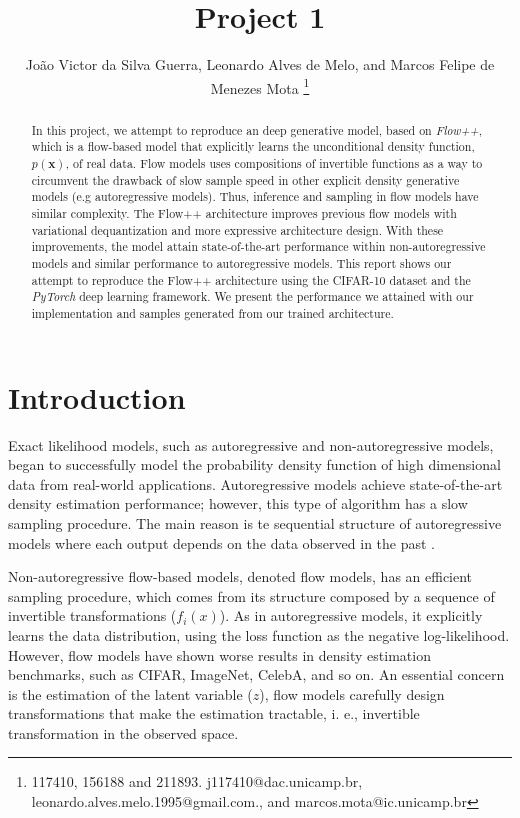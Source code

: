 \documentclass{article}
\begin{document}
\title{Project 1}
\author{
Jo\~ao Victor da Silva Guerra,
Leonardo Alves de Melo,
and Marcos Felipe de Menezes Mota
\thanks{117410, 156188 and 211893. j117410@dac.unicamp.br, leonardo.alves.melo.1995@gmail.com., and marcos.mota@ic.unicamp.br}
}

\maketitle

\begin{abstract}

In this project, we attempt to reproduce an deep generative model, based on \textit{Flow++}, which is a flow-based model that explicitly learns the unconditional density function, $p(\boldsymbol{x})$, of real data. Flow models uses compositions of invertible functions as a way to circumvent the drawback of slow sample speed in other explicit density generative models (e.g autoregressive models). Thus, inference and sampling in flow models have similar complexity. The Flow++ architecture improves previous flow models with variational dequantization and more expressive architecture design. With these improvements, the model attain state-of-the-art performance within non-autoregressive models and similar performance to autoregressive models. This report shows our attempt to reproduce the Flow++ architecture using the CIFAR-10 dataset and the \textit{PyTorch} deep learning framework. We present the performance we attained with our implementation and samples generated from our trained architecture.  

\end{abstract}

\section{Introduction}

Exact likelihood models, such as autoregressive and non-autoregressive models, began to successfully model the probability density function of high dimensional data from real-world applications. 
Autoregressive models achieve state-of-the-art density estimation performance; however, this type of algorithm has a slow sampling procedure. The main reason is te sequential structure of autoregressive models where each output depends on the data observed in the past \cite{ho2019flow++, weng2018flow}.

Non-autoregressive flow-based models, denoted flow models, has an efficient sampling procedure, which comes from its structure composed by a sequence of invertible transformations ($f_i(x)$). As in autoregressive models, it explicitly learns the data distribution, using the loss function as the negative log-likelihood. However, flow models have shown worse results in density estimation benchmarks, such as CIFAR, ImageNet, CelebA, and so on.
An essential concern is the estimation of the latent variable ($z$), flow models carefully design transformations that make the estimation tractable, i. e., invertible transformation in the observed space.
\end{document}
